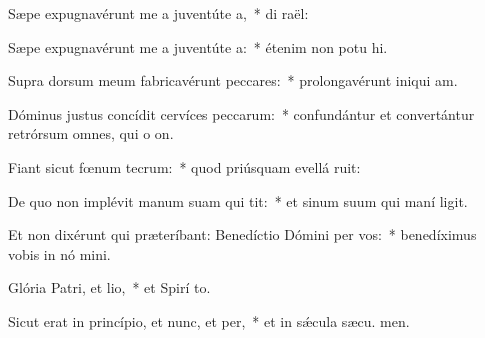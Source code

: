 \item Sæpe expugnavérunt me a juventúte a,~* di  raël:
\item Sæpe expugnavérunt me a juventúte a:~* étenim non potu hi.
\item Supra dorsum meum fabricavérunt peccares:~* prolongavérunt iniqui am.
\item Dóminus justus concídit cervíces peccarum:~* confundántur et convertántur retrórsum omnes, qui o on.
\item Fiant sicut fœnum tecrum:~* quod priúsquam evellá ruit:
\item De quo non implévit manum suam qui tit:~* et sinum suum qui maní ligit.
\item Et non dixérunt qui præteríbant: Benedíctio Dómini per vos:~* benedíximus vobis in nó mini.
\item Glória Patri, et lio,~* et Spirí to.
\item Sicut erat in princípio, et nunc, et per,~* et in sǽcula sæcu. men.
